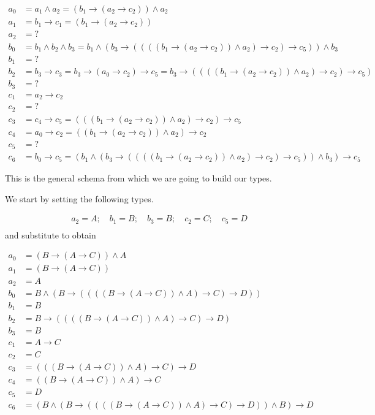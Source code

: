 \documentclass{article}
\begin{document}
\begin{equation*}
\begin{split}
a_0&= a_1 \wedge a_2 = (b_1 \to (a_2 \to c_2)) \wedge a_2 \\
a_1&= b_1 \to c_1 =  (b_1 \to (a_2 \to c_2)) \\
a_2&= ?\\   
b_0&= b_1 \wedge b_2 \wedge b_3 = b_1 \wedge (b_3 \to ((( (b_1 \to (a_2 \to c_2)) \wedge a_2) \to c_2)\to c_5)) \wedge b_3\\    
b_1&= ?\\   
b_2&= b_3 \to c_3 = b_3 \to (a_0 \to c_2)\to c_5= b_3 \to ((( (b_1 \to (a_2 \to c_2)) \wedge a_2) \to c_2)\to c_5)\\
b_3&= ?\\ 
c_1&=a_2 \to c_2 \\
c_2&= ?\\
c_3&=c_4 \to c_5 = (((b_1 \to (a_2 \to c_2)) \wedge a_2) \to c_2) \to c_5\\
c_4&= a_0 \to c_2 = ((b_1 \to (a_2 \to c_2)) \wedge a_2) \to c_2\\ 
c_5&= ?\\
c_6&= b_0 \to c_5= (b_1 \wedge (b_3 \to ((( (b_1 \to (a_2 \to c_2)) \wedge a_2) \to c_2)\to c_5)) \wedge b_3) \to c_5
\end{split}
\end{equation*}

This is the general schema from which we are going to build our types.

We start by setting the following types.

\begin{equation*}
\begin{split}
a_2= A; \quad b_1= B; \quad b_3 = B; \quad c_2= C; \quad c_5= D\\ 
\end{split}
\end{equation*}
and substitute to obtain

\begin{equation*}
\begin{split}
a_0&= (B \to (A \to C)) \wedge A \\
a_1&= (B \to (A \to C)) \\
a_2&= A\\   
b_0&= B \wedge (B \to ((( (B \to (A \to C)) \wedge A) \to C)\to D))\\    
b_1&= B\\   
b_2&=  B \to ((( (B \to (A \to C)) \wedge A) \to C)\to D)\\
b_3&= B\\ 
c_1&=A \to C \\
c_2&= C\\
c_3&= (((B \to (A \to C)) \wedge A) \to C) \to D\\
c_4&= ((B \to (A \to C)) \wedge A) \to C\\ 
c_5&= D\\
c_6&= (B \wedge (B \to ((( (B \to (A \to C)) \wedge A) \to C)\to D)) \wedge B) \to D
\end{split}
\end{equation*}
\end{document}

